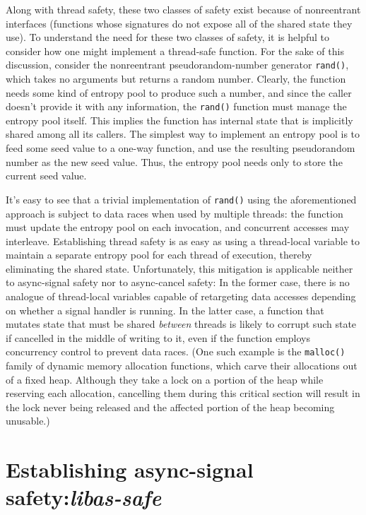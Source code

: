 Along with thread safety, these two classes of safety exist because of nonreentrant
interfaces (functions whose signatures do not expose all of the shared state
they use).  To understand the need for these two classes of safety, it is helpful to
consider how one might implement a thread-safe function.  For the sake of this
discussion, consider the nonreentrant pseudorandom-number generator \texttt{rand()},
which takes no arguments but returns a random number.  Clearly, the function needs
some kind of entropy pool to produce such a number, and since the caller doesn't
provide it with any information, the \texttt{rand()} function must manage the entropy
pool itself.  This implies the function has internal state that is implicitly shared
among all its callers.  The simplest way to implement an entropy pool is to feed some
seed value to a one-way function, and use the resulting pseudorandom number as the
new seed value.  Thus, the entropy pool needs only to store the current seed value.

It's easy to see that a trivial implementation of \texttt{rand()} using the
aforementioned approach is subject to data races when used by multiple threads:\@
the function must update the entropy pool on each invocation, and concurrent accesses
may interleave.  Establishing thread safety is as easy as using a thread-local
variable to maintain a separate entropy pool for each thread of execution, thereby
eliminating the shared state.  Unfortunately, this mitigation is applicable neither
to async-signal safety nor to async-cancel safety:  In the former case, there
is no analogue of thread-local variables capable of retargeting data accesses
depending on whether a signal handler is running.  In the latter case, a function
that mutates state that must be shared \textit{between} threads is likely to corrupt
such state if cancelled in the middle of writing to it, even if the function employs
concurrency control to prevent data races.  (One such example is the
\texttt{malloc()} family of dynamic memory allocation functions, which carve their
allocations out of a fixed heap.  Although they take a lock on a portion of the heap
while reserving each allocation, cancelling them during this critical section will
result in the lock never being released and the affected portion of the heap becoming
unusable.)


\section{Establishing async-signal safety:\@ \textit{libas-safe}}
\label{sec:safety:assafe}


